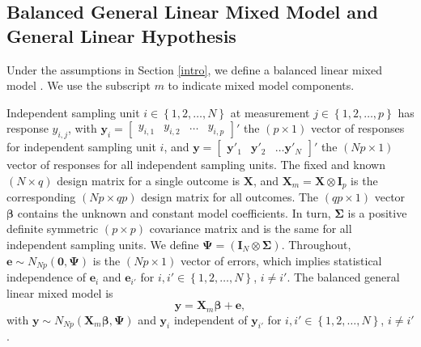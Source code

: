 \documentclass[11pt]{article}
\begin{document}
\subsection{Balanced General Linear Mixed Model and General Linear Hypothesis}
\label{recalcitrant}

Under the assumptions in Section \ref{intro}, we define a balanced linear mixed model \cite{muller_statistical_2007, ringham_multivariate_2016}. We use the subscript $m$ to indicate mixed model components.

Independent sampling unit $i\in\left\{1,2,\ldots,N\right\}$ at measurement $j\in\left\{1,2,\ldots,p\right\}$ has response $y_{i,j}$, with $\boldsymbol{y}_{i}=\begin{bmatrix}y_{i,1}&y_{i,2}&\ldots&y_{i,p}\end{bmatrix}'$ the $\left(p\times 1\right)$ vector of responses for independent sampling unit $i$, and $\boldsymbol{y}=\begin{bmatrix}\boldsymbol{y}'_{1}&\boldsymbol{y}'_{2}&\ldots\boldsymbol{y}'_{N}\end{bmatrix}'$ the $\left(Np\times 1\right)$ vector of responses for all independent sampling units. The fixed and known $\left(N\times q\right)$ design matrix for a single outcome is $\boldsymbol{X}$, and $\boldsymbol{X}_{m}=\boldsymbol{X}\otimes\boldsymbol{I}_{p}$ is the corresponding $\left(Np\times qp\right)$ design matrix for all outcomes. The $\left(qp\times 1\right)$ vector $\boldsymbol{\beta}$ contains the unknown and constant model coefficients. In turn, $\boldsymbol{\Sigma}$ is a positive definite symmetric $\left(p\times p\right)$ covariance matrix and is the same for all independent sampling units. We define $\boldsymbol{\Psi}=\left(\boldsymbol{I}_{N}\otimes\boldsymbol{\Sigma}\right)$. Throughout, $\boldsymbol{e}\sim N_{Np}\left(\boldsymbol{0},\boldsymbol{\Psi}\right)$ is the $\left(Np\times 1\right)$ vector of errors, which implies statistical independence of $\boldsymbol{e}_{i}$ and $\boldsymbol{e}_{i'}$ for $i,i'\in\left\{1,2,\ldots,N\right\}$, $i\neq i'$. The balanced general linear mixed model is
\begin{equation}
\label{mixedmodelhuzzah}
\boldsymbol{y}=\boldsymbol{X}_{m}\boldsymbol{\beta}+\boldsymbol{e},
\end{equation}
with $\boldsymbol{y}\sim N_{Np}\left(\boldsymbol{X}_{m}\boldsymbol{\beta},\boldsymbol{\Psi}\right)$ and $\boldsymbol{y}_{i}$ independent of $\boldsymbol{y}_{i'}$ for $i,i'\in\left\{1,2,\ldots,N\right\}$, $i\neq i'$.
\end{document}
